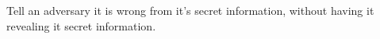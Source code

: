 
Tell an adversary it is wrong from it's secret information, without having it revealing it secret information. 

